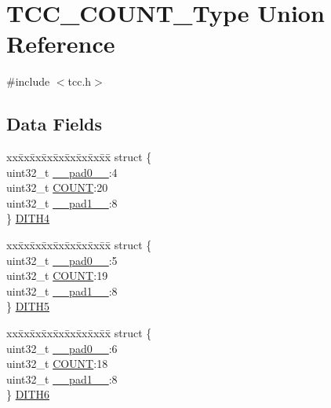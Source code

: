 \hypertarget{union_t_c_c___c_o_u_n_t___type}{}\section{T\+C\+C\+\_\+\+C\+O\+U\+N\+T\+\_\+\+Type Union Reference}
\label{union_t_c_c___c_o_u_n_t___type}


{\ttfamily \#include $<$tcc.\+h$>$}

\subsection*{Data Fields}
\begin{DoxyCompactItemize}
\item 
\begin{tabbing}
xx\=xx\=xx\=xx\=xx\=xx\=xx\=xx\=xx\=\kill
struct \{\\
\>uint32\_t \mbox{\hyperlink{union_t_c_c___c_o_u_n_t___type_a3e57c2ef1c3ffb36722f000cc1156824}{\_\_pad0\_\_}}:4\\
\>uint32\_t \mbox{\hyperlink{union_t_c_c___c_o_u_n_t___type_aa9f8906e3d27dfbf12691127c9bb88ba}{COUNT}}:20\\
\>uint32\_t \mbox{\hyperlink{union_t_c_c___c_o_u_n_t___type_a6712ba6dd1d5b43d2d56ff8ac4e275a7}{\_\_pad1\_\_}}:8\\
\} \mbox{\hyperlink{union_t_c_c___c_o_u_n_t___type_ad0e4866b12bfeabf1b17e71e55e539d0}{DITH4}}\\

\end{tabbing}\item 
\begin{tabbing}
xx\=xx\=xx\=xx\=xx\=xx\=xx\=xx\=xx\=\kill
struct \{\\
\>uint32\_t \mbox{\hyperlink{union_t_c_c___c_o_u_n_t___type_a3e57c2ef1c3ffb36722f000cc1156824}{\_\_pad0\_\_}}:5\\
\>uint32\_t \mbox{\hyperlink{union_t_c_c___c_o_u_n_t___type_aa9f8906e3d27dfbf12691127c9bb88ba}{COUNT}}:19\\
\>uint32\_t \mbox{\hyperlink{union_t_c_c___c_o_u_n_t___type_a6712ba6dd1d5b43d2d56ff8ac4e275a7}{\_\_pad1\_\_}}:8\\
\} \mbox{\hyperlink{union_t_c_c___c_o_u_n_t___type_aac480d2327cb42d6532517fb962444bf}{DITH5}}\\

\end{tabbing}\item 
\begin{tabbing}
xx\=xx\=xx\=xx\=xx\=xx\=xx\=xx\=xx\=\kill
struct \{\\
\>uint32\_t \mbox{\hyperlink{union_t_c_c___c_o_u_n_t___type_a3e57c2ef1c3ffb36722f000cc1156824}{\_\_pad0\_\_}}:6\\
\>uint32\_t \mbox{\hyperlink{union_t_c_c___c_o_u_n_t___type_aa9f8906e3d27dfbf12691127c9bb88ba}{COUNT}}:18\\
\>uint32\_t \mbox{\hyperlink{union_t_c_c___c_o_u_n_t___type_a6712ba6dd1d5b43d2d56ff8ac4e275a7}{\_\_pad1\_\_}}:8\\
\} \mbox{\hyperlink{union_t_c_c___c_o_u_n_t___type_a3c35854a6526ba867ee4b060fb0174b6}{DITH6}}\\


\end{tabbing}
\end{DoxyCompactItemize}

